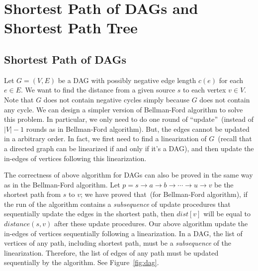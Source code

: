 \section{Shortest Path of DAGs and Shortest Path Tree}

\subsection*{Shortest Path of DAGs}
Let $G = (V, E)$ be a DAG with possibly negative edge length $c(e)$ for each $e\in E$.
We want to find the distance from a given source $s$ to each vertex $v\in V$.
Note that $G$ does not contain negative cycles simply because $G$ does not contain any cycle.
We can design a simpler version of Bellman-Ford algorithm to solve this problem.
In particular, we only need to do one round of ``update''~(instead of $|V|-1$ rounds as in Bellman-Ford algorithm).
But, the edges cannot be updated in a arbitrary order. In fact,
we first need to find a linearization of $G$~(recall that a directed graph can be linearized if and only if it's a DAG),
and then update the in-edges of vertices following this linearization.


\begin{minipage}{0.8\textwidth}
	\xxx
	\xxx
	\xxx
	\xxx
	\xxx
	\xxx
	\xxx
	\xxx
	\xxx
	\xxx
\end{minipage}


The correctness of above algorithm for DAGs can also be proved in the same way as in the Bellman-Ford algorithm.
Let $p = s \to a \to b \to \cdots \to u \to v$ be the shortest path from $s$ to $v$;
we have proved that~(for Bellman-Ford algorithm), if the run of the algorithm contains a \emph{subsequence} of update procedures
that sequentially update the edges in the shortest path, then 
$dist[v]$ will be equal to $distance(s,v)$ after these update procedures.
Our above algorithm update the in-edges of vertices sequentially following a linearization.
In a DAG, the list of vertices of any path, including shortest path, must be a \emph{subsequence}
of the linearization. Therefore, the list of edges of any path must be updated
sequentially by the algorithm. See Figure~\ref{fig:dag}.

